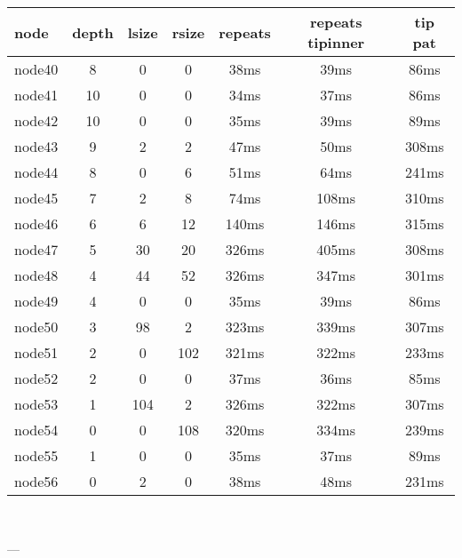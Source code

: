 \begin{tabular}{|l|c|c|c|c|c|c|}
\hline node & depth & lsize & rsize  & repeats & repeats tipinner & tip pat\\
    \hline node40 & 8 & 0 & 0 & 38ms & 39ms & 86ms\\
    \hline node41 & 10 & 0 & 0 & 34ms & 37ms & 86ms\\
    \hline node42 & 10 & 0 & 0 & 35ms & 39ms & 89ms\\
    \hline node43 & 9 & 2 & 2 & 47ms & 50ms & 308ms\\
    \hline node44 & 8 & 0 & 6 & 51ms & 64ms & 241ms\\
    \hline node45 & 7 & 2 & 8 & 74ms & 108ms & 310ms\\
    \hline node46 & 6 & 6 & 12 & 140ms & 146ms & 315ms\\
    \hline node47 & 5 & 30 & 20 & 326ms & 405ms & 308ms\\
    \hline node48 & 4 & 44 & 52 & 326ms & 347ms & 301ms\\
    \hline node49 & 4 & 0 & 0 & 35ms & 39ms & 86ms\\
    \hline node50 & 3 & 98 & 2 & 323ms & 339ms & 307ms\\
    \hline node51 & 2 & 0 & 102 & 321ms & 322ms & 233ms\\
    \hline node52 & 2 & 0 & 0 & 37ms & 36ms & 85ms\\
    \hline node53 & 1 & 104 & 2 & 326ms & 322ms & 307ms\\
    \hline node54 & 0 & 0 & 108 & 320ms & 334ms & 239ms\\
    \hline node55 & 1 & 0 & 0 & 35ms & 37ms & 89ms\\
    \hline node56 & 0 & 2 & 0 & 38ms & 48ms & 231ms\\

\hline
\end{tabular} \

---


